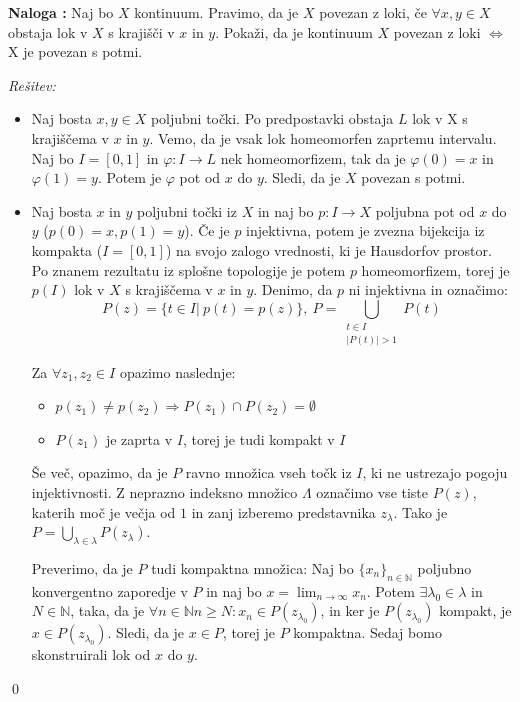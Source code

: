 \documentclass[a4paper, 10pt]{article}
\newcounter{nalogacount}
\newenvironment{naloga}{\begin{flushleft}\stepcounter{nalogacount}\textbf{Naloga \arabic{nalogacount}:}}{\hfill\end{flushleft}}
\newenvironment{Rešitev}{\begin{flushleft}\textit{Rešitev:}}{\hfill\qed\end{flushleft}}
\newcommand{\abs}[1]{\ensuremath{\lvert #1 \rvert}}
\newcommand{\mth}[1]{\ensuremath{\mathbb{#1}}}
\newcommand{\N}{\mth{N}}
\newcommand{\map}[3]{\ensuremath{{#1}: {#2} \rightarrow {#3}}}
\begin{document}
	\begin{naloga}
		Naj bo $X$ kontinuum. Pravimo, da je $X$ povezan z loki, če $\forall x, y\in X$ obstaja lok v $X$ s krajišči v $x$ in $y$. Pokaži, da je kontinuum $X$ povezan z loki $\iff$ X je povezan s potmi.
	\end{naloga}
	\begin{Rešitev}
		\begin{itemize}
			\item[$\Rightarrow):$] Naj bosta $x, y\in X$ poljubni točki. Po predpostavki obstaja $L$ lok v X s krajiščema v $x$ in $y$. Vemo, da je vsak lok homeomorfen zaprtemu intervalu. Naj bo $I = [0, 1]$ in $\map{\varphi}{I}{L}$ nek homeomorfizem, tak da je $\varphi(0) = x$ in $\varphi(1) = y$. Potem je $\varphi$ pot od $x$ do $y$. Sledi, da je $X$ povezan s potmi.
			
			\item[$\Leftarrow):$] Naj bosta $x$ in $y$ poljubni točki iz $X$ in naj bo $\map{p}{I}{X}$ poljubna pot od $x$ do $y$ ($p(0) = x, p(1) = y$). Če je $p$ injektivna, potem je zvezna bijekcija iz kompakta ($I = [0, 1]$) na svojo zalogo vrednosti, ki je Hausdorfov prostor. Po znanem rezultatu iz splošne topologije je potem $p$ homeomorfizem, torej je $p(I)$ lok v $X$ s krajiščema v $x$ in $y$. Denimo, da $p$ ni injektivna in označimo: $$P(z) = \{t\in I |~ p(t) = p(z)\},~ P = \bigcup_{\substack{t\in I \\ \abs{P(t)} > 1}} P(t)$$
			
			Za $\forall z_1, z_2 \in I$ opazimo naslednje: \begin{itemize}
				\item $p(z_1) \neq p(z_2) \Rightarrow P(z_1)\cap P(z_2) = \emptyset$
				\item $P(z_1)$ je zaprta v $I$, torej je tudi kompakt v $I$
			\end{itemize} 
			Še več, opazimo, da je $P$ ravno množica vseh točk iz $I$, ki ne ustrezajo pogoju injektivnosti. Z neprazno indeksno množico $\Lambda$ označimo vse tiste $P(z)$, katerih moč je večja od $1$ in zanj izberemo predstavnika $z_\lambda$. Tako je $P= \bigcup_{\lambda \in \lambda} P(z_\lambda)$.
			
			Preverimo, da je $P$ tudi kompaktna množica: Naj bo $\{x_n\}_{n\in\N}$ poljubno konvergentno zaporedje v $P$ in naj bo $x = \lim_{n\to\infty}x_n$. Potem $\exists \lambda_0\in \lambda$ in $N\in\N$, taka, da je $\forall n\in \N n\geq N: x_n \in P(z_{\lambda_0})$, in ker je $P(z_{\lambda_0})$ kompakt, je $x\in P(z_{\lambda_0})$. Sledi, da je $x\in P$, torej je $P$ kompaktna. Sedaj bomo skonstruirali lok od $x$ do $y$.
			

\end{itemize}
\end{Rešitev}
\end{document}
